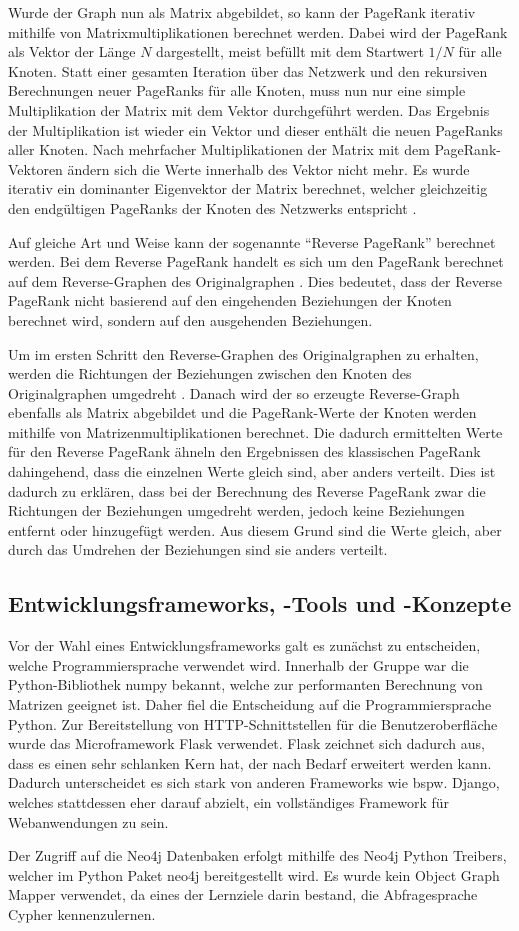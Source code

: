 Wurde der Graph nun als Matrix abgebildet, so kann der PageRank iterativ mithilfe von Matrixmultiplikationen berechnet werden. Dabei wird der PageRank als Vektor der Länge $N$ dargestellt, meist befüllt mit dem Startwert $1/N$ für alle Knoten. Statt einer gesamten Iteration über das Netzwerk und den rekursiven Berechnungen neuer PageRanks für alle Knoten, muss nun nur eine simple Multiplikation der Matrix mit dem Vektor durchgeführt werden. Das Ergebnis der Multiplikation ist wieder ein Vektor und dieser enthält die neuen PageRanks aller Knoten. Nach mehrfacher Multiplikationen der Matrix mit dem PageRank-Vektoren ändern sich die Werte innerhalb des Vektor nicht mehr. Es wurde iterativ ein dominanter Eigenvektor der Matrix berechnet, welcher gleichzeitig den endgültigen PageRanks der Knoten des Netzwerks entspricht \cite{pagerank_eigenvector}.

Auf gleiche Art und Weise kann der sogenannte ``Reverse PageRank'' berechnet werden. Bei dem Reverse PageRank handelt es sich um den PageRank berechnet auf dem Reverse-Graphen des Originalgraphen \cite{reverse_pagerank}. Dies bedeutet, dass der Reverse PageRank nicht basierend auf den eingehenden Beziehungen der Knoten berechnet wird, sondern auf den ausgehenden Beziehungen.

Um im ersten Schritt den Reverse-Graphen des Originalgraphen zu erhalten, werden die Richtungen der Beziehungen zwischen den Knoten des Originalgraphen umgedreht \cite{reverse_pagerank}. Danach wird der so erzeugte Reverse-Graph ebenfalls als Matrix abgebildet und die PageRank-Werte der Knoten werden mithilfe von Matrizenmultiplikationen berechnet. Die dadurch ermittelten Werte für den Reverse PageRank ähneln den Ergebnissen des klassischen PageRank dahingehend, dass die einzelnen Werte gleich sind, aber anders verteilt. Dies ist dadurch zu erklären, dass bei der Berechnung des Reverse PageRank zwar die Richtungen der Beziehungen umgedreht werden, jedoch keine Beziehungen entfernt oder hinzugefügt werden. Aus diesem Grund sind die Werte gleich, aber durch das Umdrehen der Beziehungen sind sie anders verteilt.

\subsection{Entwicklungsframeworks, -Tools und -Konzepte}

Vor der Wahl eines Entwicklungsframeworks galt es zunächst zu entscheiden, welche Programmiersprache verwendet wird.
Innerhalb der Gruppe war die Python-Bibliothek numpy bekannt, welche zur performanten Berechnung von Matrizen geeignet ist.\cite{numpy}
Daher fiel die Entscheidung auf die Programmiersprache Python. Zur Bereitstellung von HTTP-Schnittstellen für die Benutzeroberfläche wurde das Microframework Flask verwendet.
Flask zeichnet sich dadurch aus, dass es einen sehr schlanken Kern hat, der nach Bedarf erweitert werden kann.\cite{flask}
Dadurch unterscheidet es sich stark von anderen Frameworks wie bspw. Django, welches stattdessen eher darauf abzielt, ein vollständiges Framework für Webanwendungen zu sein.\cite{django}

Der Zugriff auf die Neo4j Datenbaken erfolgt mithilfe des Neo4j Python Treibers, welcher im Python Paket neo4j bereitgestellt wird.\cite{pip_neo4j}
Es wurde kein Object Graph Mapper verwendet, da eines der Lernziele darin bestand, die Abfragesprache Cypher kennenzulernen.


